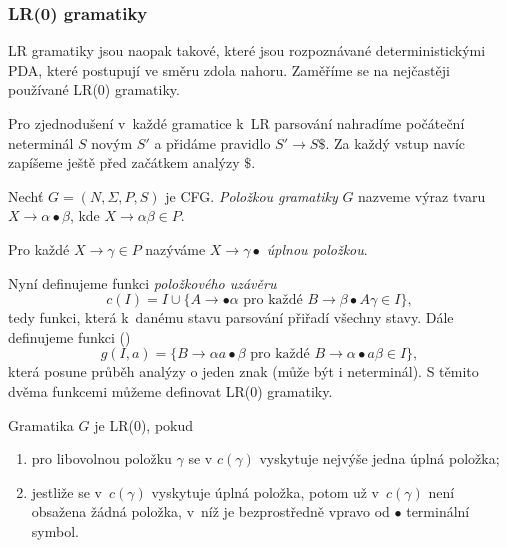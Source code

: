 \subsubsection{LR(0) gramatiky}


LR gramatiky jsou naopak takové, které jsou rozpoznávané deterministickými PDA,
které postupují ve směru zdola nahoru. Zaměříme se na nejčastěji
používané LR(0) gramatiky.

Pro zjednodušení v~každé gramatice k~LR parsování nahradíme počáteční
neterminál $S$ novým $S'$ a přidáme pravidlo $S' \to S\$$. Za každý
vstup navíc zapíšeme ještě před začátkem analýzy $\$$.

\begin{definition}
    Nechť $G = (N, \Sigma, P, S)$ je CFG.
    {\em Položkou gramatiky} $G$ nazveme výraz tvaru
    $X \to \alpha \bullet \beta$, kde $X \to \alpha \beta \in P$.

    Pro každé $X \to \gamma \in P$ nazýváme $X \to \gamma \bullet$
    {\em úplnou položkou}.
\end{definition}

Nyní definujeme funkci {\em položkového uzávěru}
\[
    c(I) = I \cup
    \{ A \to \bullet \alpha \text{ pro každé } B \to \beta \bullet A \gamma \in I \},
\]
tedy funkci, která k~danému stavu parsování přiřadí všechny
 stavy. Dále definujeme funkci ()
\[
g(I, a) = \{ B \to \alpha a \bullet \beta \text{ pro každé }
    B \to \alpha \bullet a \beta \in I \},
\]
která posune průběh analýzy o jeden znak (může být i neterminál).
S těmito dvěma funkcemi můžeme definovat LR(0) gramatiky.

\begin{definition}
    Gramatika $G$ je LR(0), pokud
    \begin{enumerate}
        \item pro libovolnou položku $\gamma$ se v $c(\gamma)$ vyskytuje
            nejvýše jedna úplná položka;
        \item jestliže se v~$c(\gamma)$ vyskytuje úplná položka, potom
            už v~$c(\gamma)$ není obsažena žádná položka, v~níž
            je bezprostředně vpravo od $\bullet$ terminální symbol.
    \end{enumerate}
\end{definition}

